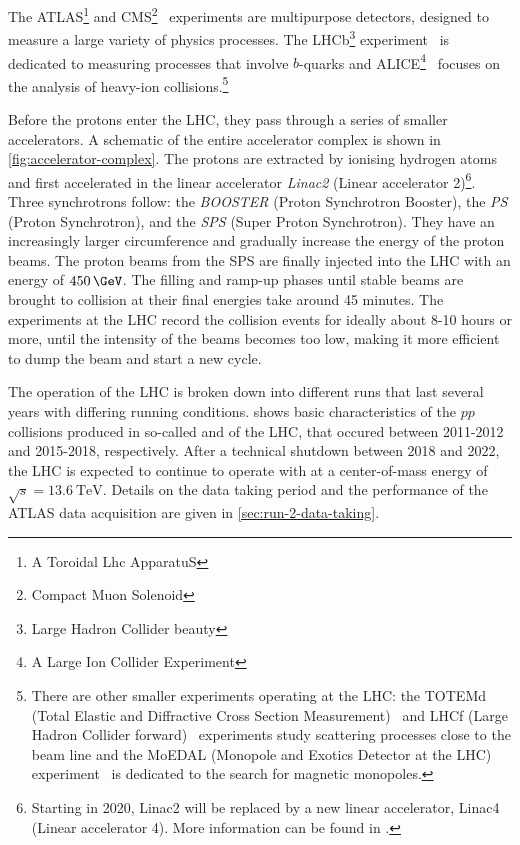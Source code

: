 The ATLAS\footnote{A Toroidal Lhc ApparatuS} and CMS\footnote{Compact Muon Solenoid}~\cite{CMS-TDR-08-001} experiments are multipurpose detectors, designed to measure a large variety of physics processes. The LHCb\footnote{Large Hadron Collider beauty} experiment~\cite{1748-0221-3-08-S08005} is dedicated to measuring processes that involve $b$-quarks and ALICE\footnote{A Large Ion Collider Experiment}~\cite{1748-0221-3-08-S08002} focuses on the analysis of heavy-ion collisions.\footnote{There are other smaller experiments operating at the LHC: the TOTEMd (Total Elastic and Diffractive Cross Section Measurement)~\cite{1748-0221-3-08-S08007} and LHCf (Large Hadron Collider forward)~\cite{1748-0221-3-08-S08006} experiments study scattering processes close to the beam line and the MoEDAL (Monopole and Exotics Detector at the LHC) experiment~\cite{1742-6596-631-1-012014} is dedicated to the search for magnetic monopoles.}

Before the protons enter the LHC, they pass through a series of smaller accelerators. A schematic of the entire accelerator complex is shown in \cref{fig:accelerator-complex}.
The protons are extracted by ionising hydrogen atoms and first accelerated in the linear accelerator \emph{Linac2} (Linear accelerator 2)\footnote{Starting in 2020, Linac2 will be replaced by a new linear accelerator, Linac4 (Linear accelerator 4). More information can be found in .}. Three synchrotrons follow: the \emph{BOOSTER} (Proton Synchrotron Booster), the \emph{PS} (Proton Synchrotron), and the \emph{SPS} (Super Proton Synchrotron).
They have an increasingly larger circumference and gradually increase the energy of the proton beams.
The proton beams from the SPS are finally injected into the LHC with an energy of $450\,\GeV$. The filling and ramp-up phases until stable beams are brought to collision at their final energies take around 45 minutes. The experiments at the LHC record the collision events for ideally about 8-10 hours or more, until the intensity of the beams becomes too low, making it more efficient to dump the beam and start a new cycle.

The operation of the LHC is broken down into different runs that last several years with differing running conditions.
 shows basic characteristics of the $pp$ collisions produced in so-called \RunOne and \RunTwo of the LHC, that occured between 2011-2012 and 2015-2018, respectively. After a technical shutdown between 2018 and 2022, the LHC is expected to continue to operate with \RunThr at a center-of-mass energy of $\sqrt{s} = \SI{13.6}{\TeV}$.
Details on the \RunTwo data taking period and the performance of the ATLAS data acquisition are given in \cref{sec:run-2-data-taking}.

